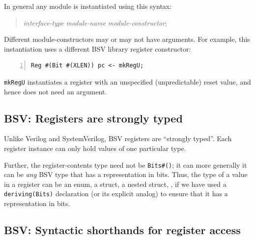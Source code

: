 
In general any module is instantiated using this syntax:

\begin{quote}
\emph{interface-type} \hm \emph{module-name} \hm {\tt <-} \hm \emph{module-constructor};
\end{quote}

Different module-constructors may or may not have arguments.  For
example, this instantiation uses a different BSV library register
constructor:


\begin{Verbatim}[frame=single, numbers=left]
   Reg #(Bit #(XLEN)) pc <- mkRegU;
\end{Verbatim}

\verb|mkRegU| instantiates a register with an unspecified
(unpredictable) reset value, and hence does not need an argument.


\subsection{BSV: Registers are strongly typed}


Unlike Verilog and SystemVerilog, BSV registers are ``strongly
typed''.  Each register instance can only hold values of one
particular type.

Further, the register-contents type need not be \verb|Bits#()|; it can
more generally it can be \emph{any} BSV type that has a representation
in bits.  Thus, the type of a value in a register can be an enum, a
struct, a nested struct, {\etc}, if we have used a
\verb|deriving(Bits)| declaration (or its explicit analog) to ensure
that it has a representation in bits.


\subsection{BSV: Syntactic shorthands for register access}

\label{Sec_CPU_Module_Skeleton_register_syntactic_shorthands}

